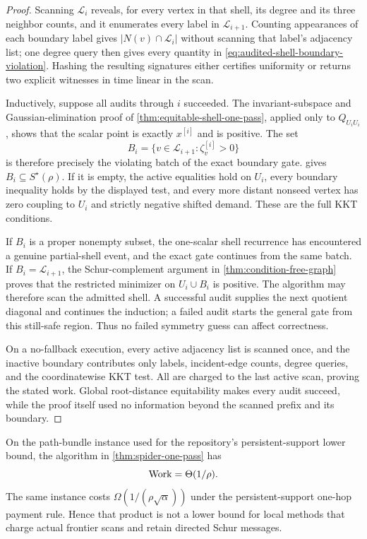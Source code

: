 \begin{proof}
Scanning $\mathcal L_i$ reveals, for every vertex in that shell, its degree
and its three neighbor counts, and it enumerates every label in
$\mathcal L_{i+1}$.  Counting appearances of each boundary label gives
$|N(v)\cap\mathcal L_i|$ without scanning that label's adjacency list; one
degree query then gives every quantity in
\cref{eq:audited-shell-boundary-violation}.  Hashing the resulting signatures
either certifies uniformity or returns two explicit witnesses in time linear
in the scan.

Inductively, suppose all audits through $i$ succeeded.  The invariant-subspace
and Gaussian-elimination proof of
\cref{thm:equitable-shell-one-pass}, applied only to $Q_{U_iU_i}$, shows that
the scalar point is exactly $x^{[i]}$ and is positive.  The set
\begin{equation*}
 B_i=\{v\in\mathcal L_{i+1}:\zeta_v^{[i]}>0\}
\end{equation*}
is therefore precisely the violating batch of the exact boundary gate.
 gives
$B_i\subseteq S^\star(\rho)$.  If it is empty, the active equalities hold on
$U_i$, every boundary inequality holds by the displayed test, and every more
distant nonseed vertex has zero coupling to $U_i$ and strictly negative
shifted demand.  These are the full KKT conditions.

If $B_i$ is a proper nonempty subset, the one-scalar shell recurrence has
encountered a genuine partial-shell event, and the exact gate continues from
the same batch.  If $B_i=\mathcal L_{i+1}$, the Schur-complement argument in
\cref{thm:condition-free-graph} proves that the restricted minimizer on
$U_i\cup B_i$ is positive.  The algorithm may therefore scan the admitted
shell.  A successful audit supplies the next quotient diagonal and continues
the induction; a failed audit starts the general gate from this still-safe
region.  Thus no failed symmetry guess can affect correctness.

On a no-fallback execution, every active adjacency list is scanned once, and
the inactive boundary contributes only labels, incident-edge counts, degree
queries, and the coordinatewise KKT test.  All are charged to the last active
scan, proving the stated work.  Global root-distance equitability makes every
audit succeed, while the proof itself used no information beyond the scanned
prefix and its boundary.
\end{proof}

\begin{corollary}
\label{cor:spider-oracle-separation}
On the path-bundle instance used for the repository's persistent-support
lower bound, the algorithm in \cref{thm:spider-one-pass} has
\begin{equation}
 \operatorname{Work}=\Theta(1/\rho).
 \label{eq:spider-direct-work}
\end{equation}
The same instance costs
$\Omega(1/(\rho\sqrt\alpha))$ under the persistent-support one-hop payment
rule.  Hence that product is not a lower bound for local methods that charge
actual frontier scans and retain directed Schur messages.
\end{corollary}

